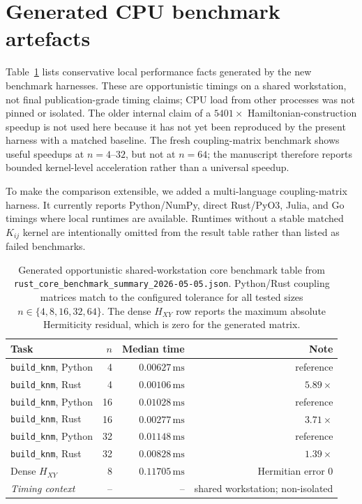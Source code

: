 \documentclass[preprint,aps,physrev,superscriptaddress,floatfix,longbibliography]{revtex4-2}
\begin{document}
\section{Generated CPU benchmark artefacts}

Table~\ref{tab:performance} lists conservative local performance facts generated
by the new benchmark harnesses. These are opportunistic timings on a shared
workstation, not final publication-grade timing claims; CPU load from other
processes was not pinned or isolated. The older internal claim of a
$5401\times$ Hamiltonian-construction speedup is not used here because it
has not yet been reproduced by the present harness with a matched baseline.
The fresh coupling-matrix benchmark shows useful speedups at $n=4$--$32$,
but not at $n=64$; the manuscript therefore reports bounded kernel-level
acceleration rather than a universal speedup.

To make the comparison extensible, we added a multi-language
coupling-matrix harness. It currently reports Python/NumPy, direct
Rust/PyO3, Julia, and Go timings where local runtimes are available.
Runtimes without a stable matched $K_{ij}$ kernel are intentionally omitted
from the result table rather than listed as failed benchmarks.

\begin{table}[tb]
\centering
\small
\begin{tabular}{lrrr}
\toprule
Task & $n$ & Median time & Note \\
\midrule
\texttt{build\_knm}, Python & 4 & $0.00627\,\mathrm{ms}$ & reference \\
\texttt{build\_knm}, Rust & 4 & $0.00106\,\mathrm{ms}$ & $5.89\times$ \\
\texttt{build\_knm}, Python & 16 & $0.01028\,\mathrm{ms}$ & reference \\
\texttt{build\_knm}, Rust & 16 & $0.00277\,\mathrm{ms}$ & $3.71\times$ \\
\texttt{build\_knm}, Python & 32 & $0.01148\,\mathrm{ms}$ & reference \\
\texttt{build\_knm}, Rust & 32 & $0.00828\,\mathrm{ms}$ & $1.39\times$ \\
Dense $H_{XY}$ & 8 & $0.11705\,\mathrm{ms}$ & Hermitian error 0 \\
\emph{Timing context} & -- & -- & shared workstation; non-isolated \\
\bottomrule
\end{tabular}
\caption{Generated opportunistic shared-workstation core benchmark table from
\texttt{rust\_core\_benchmark\_summary\_2026-05-05.json}. Python/Rust
coupling matrices match to the configured tolerance for all tested
sizes $n\in\{4,8,16,32,64\}$. The dense $H_{XY}$ row reports the maximum
absolute Hermiticity residual, which is zero for the generated matrix.}
\label{tab:performance}
\end{table}
\end{document}
